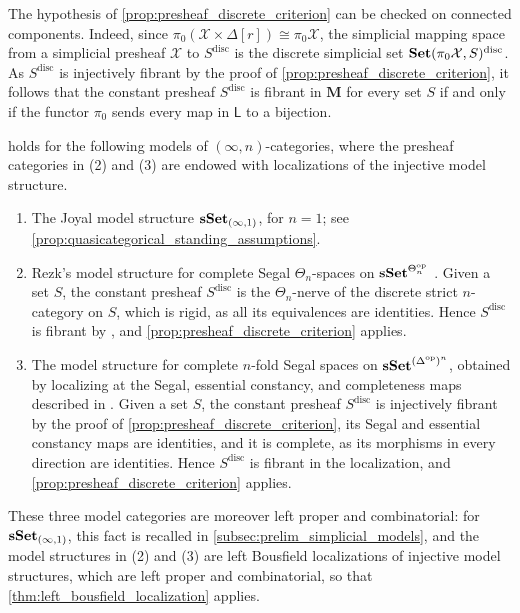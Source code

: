\documentclass[10pt,reqno]{amsart}
\begin{document}
\begin{rmk}
\label{rem:presheaf_discrete_components}
The hypothesis of \cref{prop:presheaf_discrete_criterion} can be
checked on connected components. Indeed, since
$\pi_0(\mathcal X\times\Delta[r])\cong\pi_0\mathcal X$, the
simplicial mapping space from a simplicial presheaf $\mathcal X$ to
$S^{\mathrm{disc}}$ is the discrete simplicial set
$\mathbf{Set}(\pi_0\mathcal X,S)^{\mathrm{disc}}$. As $S^{\mathrm{disc}}$
is injectively fibrant by the proof of
\cref{prop:presheaf_discrete_criterion}, it follows that the constant
presheaf $S^{\mathrm{disc}}$ is fibrant in $\mathbf M$ for every
set $S$ if and only if the functor $\pi_0$ sends every map in
$\mathsf L$ to a bijection.
\end{rmk}

 holds for the following
models of $(\infty,n)$-categories, where the presheaf categories in
\textup{(2)} and \textup{(3)} are endowed with localizations of the
injective model structure.
\begin{enumerate}[label=\textup{(\arabic*)}]
\item The Joyal model structure $\mathbf{sSet}_{(\infty,1)}$, for $n=1$;
see \cref{prop:quasicategorical_standing_assumptions}.
\item Rezk's model structure for complete Segal $\Theta_n$-spaces
on $\mathbf{sSet}^{\Theta_n^{\mathrm{op}}}$ \cite{Rezk2010}. Given a set
$S$, the constant presheaf $S^{\mathrm{disc}}$ is the
$\Theta_n$-nerve of the discrete strict $n$-category on $S$,
which is rigid, as all its equivalences are identities. Hence
$S^{\mathrm{disc}}$ is fibrant by
\cite[Proposition~11.24]{Rezk2010}, and
\cref{prop:presheaf_discrete_criterion} applies.
\item The model structure for complete $n$-fold Segal spaces on
$\mathbf{sSet}^{(\Delta^{\mathrm{op}})^n}$, obtained by localizing at the
Segal, essential constancy, and completeness maps described in
\cite[\S2.3.1]{calaque2019cobordisms}. Given a set $S$, the constant
presheaf $S^{\mathrm{disc}}$ is injectively fibrant by the proof of
\cref{prop:presheaf_discrete_criterion}, its Segal and essential
constancy maps are identities, and it is complete, as its morphisms in
every direction are identities. Hence $S^{\mathrm{disc}}$ is fibrant
in the localization, and \cref{prop:presheaf_discrete_criterion}
applies.
\end{enumerate}
These three model categories are moreover left proper and
combinatorial: for $\mathbf{sSet}_{(\infty,1)}$, this fact is recalled in
\cref{subsec:prelim_simplicial_models}, and the model structures in
\textup{(2)} and \textup{(3)} are left Bousfield localizations of
injective model structures, which are left proper and combinatorial,
so that \cref{thm:left_bousfield_localization} applies.
\end{document}
